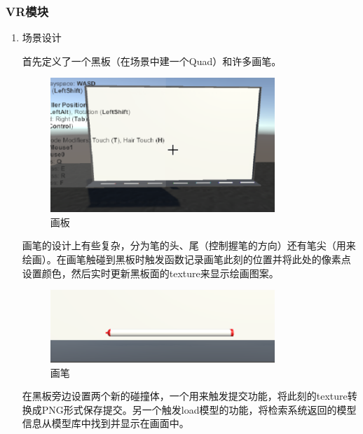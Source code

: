 \documentclass{article}
\begin{document}
\subsubsection{VR模块}
\begin{enumerate}
    \item 场景设计
    
    \qquad 首先定义了一个黑板（在场景中建一个Quad）和许多画笔。
    
    \begin{figure}[htb]
    \centering
    \includegraphics[width=0.8\textwidth]{images/board.png}
    \caption{画板}\label{fig:digit}
    \end{figure} 
    
    
    \qquad 画笔的设计上有些复杂，分为笔的头、尾（控制握笔的方向）还有笔尖（用来绘画）。在画笔触碰到黑板时触发函数记录画笔此刻的位置并将此处的像素点设置颜色，然后实时更新黑板面的texture来显示绘画图案。
    
    \begin{figure}[htb]
    \centering
    \includegraphics[width=0.8\textwidth]{images/pen.png}
    \caption{画笔}\label{fig:digit}
    \end{figure}
    
    \qquad 在黑板旁边设置两个新的碰撞体，一个用来触发提交功能，将此刻的texture转换成PNG形式保存提交。另一个触发load模型的功能，将检索系统返回的模型信息从模型库中找到并显示在画面中。
    

\end{enumerate}
\end{document}
